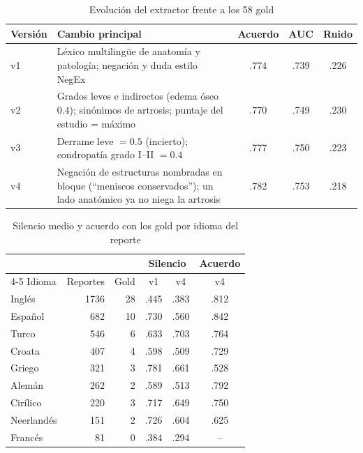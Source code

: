 \documentclass{article}
\begin{document}
\begin{table}[h]
  \caption{Evolución del extractor frente a los 58 gold}
  \label{tab:ext-versiones}
  \centering
  \small
  \setlength{\tabcolsep}{4pt}
  \begin{tabular}{@{}lp{}ccc@{}}
    \toprule
    Versión & Cambio principal & Acuerdo & AUC & Ruido \\
    \midrule
    v1 & Léxico multilingüe de anatomía y patología; negación y duda estilo NegEx & .774 & .739 & .226 \\
    v2 & Grados leves e indirectos (edema óseo $0.4$); sinónimos de artrosis; puntaje del estudio = máximo & .770 & .749 & .230 \\
    v3 & Derrame leve $=0.5$ (incierto); condropatía grado I--II $=0.4$ & .777 & .750 & .223 \\
    v4 & Negación de estructuras nombradas en bloque (``meniscos conservados''); un lado anatómico ya no niega la artrosis & .782 & .753 & .218 \\
    \bottomrule
  \end{tabular}
\end{table}

\begin{table}[h]
  \caption{Silencio medio y acuerdo con los gold por idioma del reporte}
  \label{tab:ext-idioma}
  \centering
  \small
  \begin{tabular}{@{}lrrccc@{}}
    \toprule
    & & & \multicolumn{2}{c}{Silencio} & Acuerdo \\
    \cmidrule(lr){4-5}
    Idioma & Reportes & Gold & v1 & v4 & v4 \\
    \midrule
    Inglés     & 1736 & 28 & .445 & .383 & .812 \\
    Español    &  682 & 10 & .730 & .560 & .842 \\
    Turco      &  546 &  6 & .633 & .703 & .764 \\
    Croata     &  407 &  4 & .598 & .509 & .729 \\
    Griego     &  321 &  3 & .781 & .661 & .528 \\
    Alemán     &  262 &  2 & .589 & .513 & .792 \\
    Cirílico   &  220 &  3 & .717 & .649 & .750 \\
    Neerlandés &  151 &  2 & .726 & .604 & .625 \\
    Francés    &   81 &  0 & .384 & .294 & --   \\
    \bottomrule
  \end{tabular}
\end{table}
\end{document}
